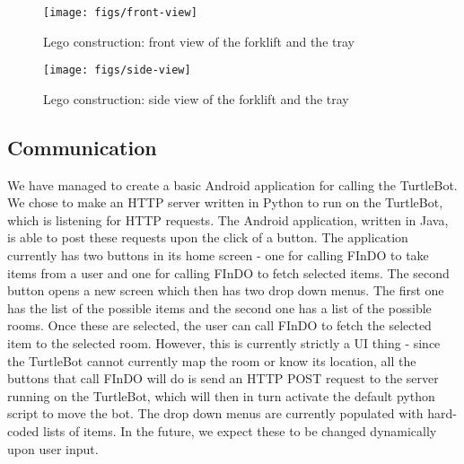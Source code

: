 \documentclass{article}
\begin{document}

\begin{figure}[tb]
\vskip 5mm
\begin{center}
\centerline{\texttt{[image: figs/front-view]}}
\caption{Lego construction: front view of the forklift and the tray}
\label{fig:sample-fig}
\end{center}
\vskip -5mm
\end{figure} 

\begin{figure}[tb]
\vskip 5mm
\begin{center}
\centerline{\texttt{[image: figs/side-view]}}
\caption{Lego construction: side view of the forklift and the tray}
\label{fig:sample-fig}
\end{center}
\vskip -5mm
\end{figure} 

\subsection{Communication}

We have managed to create a basic Android application for calling the TurtleBot. We chose to make an HTTP server written in Python to run on the TurtleBot, which is listening for HTTP requests. The Android application, written in Java, is able to post these requests upon the click of a button.
The application currently has two buttons in its home screen - one for calling FInDO to take items from a user and one for calling FInDO to fetch selected items. The second button opens a new screen which then has two drop down menus. The first one has the list of the possible items and the second one has a list of the possible rooms. Once these are selected, the user can call FInDO to fetch the selected item to the selected room. However, this is currently strictly a UI thing - since the TurtleBot cannot currently map the room or know its location, all the buttons that call FInDO will do is send an HTTP POST request to the server running on the TurtleBot, which will then in turn activate the default python script to move the bot. 
The drop down menus are currently populated with hard-coded lists of items. In the future, we expect these to be changed dynamically upon user input.
\end{document}
